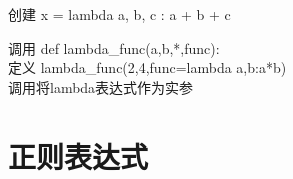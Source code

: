 \documentclass{beamer}
\begin{document}
\begin{frame}[t]
	\begin{block}{创建}
		x = lambda a, b, c : a + b + c
	\end{block}
	\pause
	\begin{block}{调用}
		def lambda\_func(a,b,*,func):\\定义
		lambda\_func(2,4,func=lambda a,b:a*b)\\调用将lambda表达式作为实参

	\end{block}
\end{frame}

\section{正则表达式}
\end{document}
